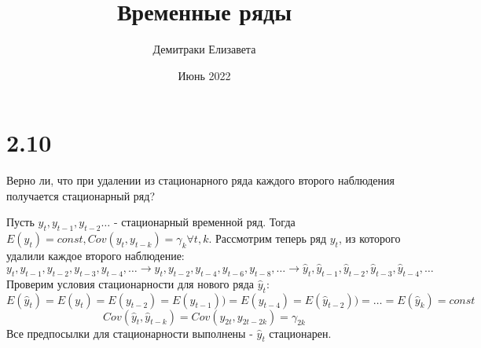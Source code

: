 \documentclass{article}
\title{Временные ряды}
\author{Демитраки Елизавета}
\date{Июнь 2022}
\begin{document}
\maketitle
\section{2.10}
\begin{problem}
Верно ли, что при удалении из стационарного ряда каждого второго наблюдения получается стационарный ряд?


\begin{sol}
Пусть $y_t, y_{t-1}, y_{t-2} \dots $ - стационарный временной ряд. Тогда 
$
E(y_t) = const, Cov(y_t, y_{t-k}) = \gamma_k  \forall t,k
$. Рассмотрим теперь ряд $y_t$, из которого удалили каждое второго наблюдение: 
$$
y_t, y_{t-1}, y_{t-2}, y_{t-3}, y_{t-4}, \dots \rightarrow y_t, y_{t-2}, y_{t-4}, y_{t-6}, y_{t-8}, \dots \rightarrow \hat{y}_t, \hat{y}_{t-1}, \hat{y}_{t-2}, \hat{y}_{t-3}, \hat{y}_{t-4}, \dots
$$
Проверим условия стационарности для нового ряда $\hat{y}_t$:
$$
E(\hat{y}_t) = E(y_t) = E(y_{t-2}) = E(\hat{y}_{t-1})) = E(y_{t-4}) = E(\hat{y}_{t-2})) = \dots = E(\hat{y}_k) = const 
$$
$$
Cov(\hat{y}_t, \hat{y}_{t-k}) = Cov(y_{2t}, y_{2t-2k}) = \gamma_{2k} 
$$
Все предпосылки для стационарности выполнены - $\hat{y}_t$ стационарен.
\end{sol}
\end{problem}
\end{document}
